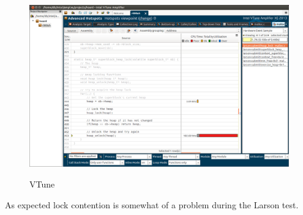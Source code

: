 \documentclass[oneside]{amsart}
\theoremstyle{definition}
\theoremstyle{remark}
\numberwithin{equation}{section}
\begin{document}
\begin{figure}[h]
    \caption{VTune}
    \centering
    \includegraphics[scale=0.28]{VTune.png}
    \label{fig:plot}
\end{figure}

As expected lock contention is somewhat of a problem during the Larson test.

\end{document}
